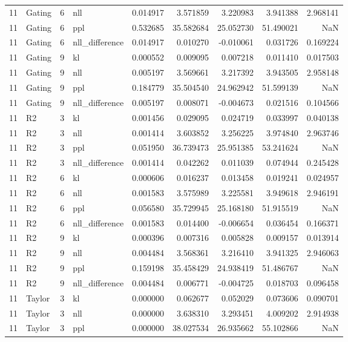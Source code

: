 \begin{tabular}{rlrlrrrrr}
11 & Gating & 6 & nll & 0.014917 & 3.571859 & 3.220983 & 3.941388 & 2.968141 \\
11 & Gating & 6 & ppl & 0.532685 & 35.582684 & 25.052730 & 51.490021 & NaN \\
11 & Gating & 6 & nll_difference & 0.014917 & 0.010270 & -0.010061 & 0.031726 & 0.169224 \\
11 & Gating & 9 & kl & 0.000552 & 0.009095 & 0.007218 & 0.011410 & 0.017503 \\
11 & Gating & 9 & nll & 0.005197 & 3.569661 & 3.217392 & 3.943505 & 2.958148 \\
11 & Gating & 9 & ppl & 0.184779 & 35.504540 & 24.962942 & 51.599139 & NaN \\
11 & Gating & 9 & nll_difference & 0.005197 & 0.008071 & -0.004673 & 0.021516 & 0.104566 \\
11 & R2 & 3 & kl & 0.001456 & 0.029095 & 0.024719 & 0.033997 & 0.040138 \\
11 & R2 & 3 & nll & 0.001414 & 3.603852 & 3.256225 & 3.974840 & 2.963746 \\
11 & R2 & 3 & ppl & 0.051950 & 36.739473 & 25.951385 & 53.241624 & NaN \\
11 & R2 & 3 & nll_difference & 0.001414 & 0.042262 & 0.011039 & 0.074944 & 0.245428 \\
11 & R2 & 6 & kl & 0.000606 & 0.016237 & 0.013458 & 0.019241 & 0.024957 \\
11 & R2 & 6 & nll & 0.001583 & 3.575989 & 3.225581 & 3.949618 & 2.946191 \\
11 & R2 & 6 & ppl & 0.056580 & 35.729945 & 25.168180 & 51.915519 & NaN \\
11 & R2 & 6 & nll_difference & 0.001583 & 0.014400 & -0.006654 & 0.036454 & 0.166371 \\
11 & R2 & 9 & kl & 0.000396 & 0.007316 & 0.005828 & 0.009157 & 0.013914 \\
11 & R2 & 9 & nll & 0.004484 & 3.568361 & 3.216410 & 3.941325 & 2.946063 \\
11 & R2 & 9 & ppl & 0.159198 & 35.458429 & 24.938419 & 51.486767 & NaN \\
11 & R2 & 9 & nll_difference & 0.004484 & 0.006771 & -0.004725 & 0.018703 & 0.096458 \\
11 & Taylor & 3 & kl & 0.000000 & 0.062677 & 0.052029 & 0.073606 & 0.090701 \\
11 & Taylor & 3 & nll & 0.000000 & 3.638310 & 3.293451 & 4.009202 & 2.914938 \\
11 & Taylor & 3 & ppl & 0.000000 & 38.027534 & 26.935662 & 55.102866 & NaN \\

\end{tabular}
